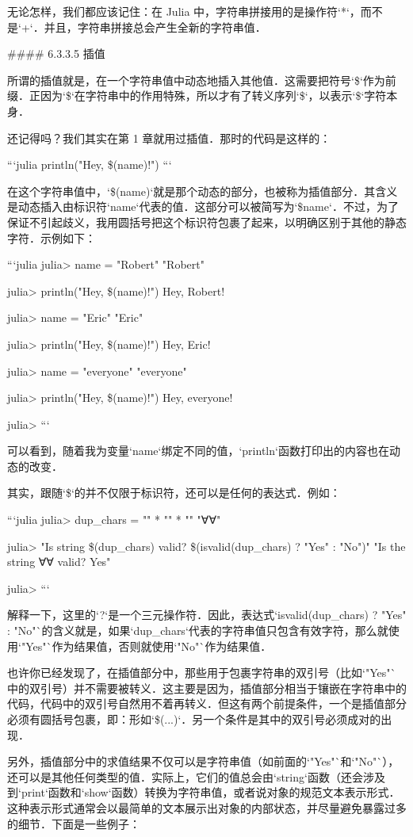 无论怎样，我们都应该记住：在 Julia 中，字符串拼接用的是操作符`*`，而不是`+`．并且，字符串拼接总会产生全新的字符串值．

#### 6.3.3.5 插值

所谓的插值就是，在一个字符串值中动态地插入其他值．这需要把符号`\$`作为前缀．正因为`\$`在字符串中的作用特殊，所以才有了转义序列`\$`，以表示`\$`字符本身．

还记得吗？我们其实在第 1 章就用过插值．那时的代码是这样的：

```julia
println("Hey, \$(name)!")
```

在这个字符串值中，`\$(name)`就是那个动态的部分，也被称为插值部分．其含义是动态插入由标识符`name`代表的值．这部分可以被简写为`\$name`．不过，为了保证不引起歧义，我用圆括号把这个标识符包裹了起来，以明确区别于其他的静态字符．示例如下：

```julia
julia> name = "Robert"
"Robert"

julia> println("Hey, \$(name)!")
Hey, Robert!

julia> name = "Eric"
"Eric"

julia> println("Hey, \$(name)!")
Hey, Eric!

julia> name = "everyone"
"everyone"

julia> println("Hey, \$(name)!")
Hey, everyone!

julia> 
```

可以看到，随着我为变量`name`绑定不同的值，`println`函数打印出的内容也在动态的改变．

其实，跟随`\$`的并不仅限于标识符，还可以是任何的表达式．例如：

```julia
julia> dup_chars = "" * "" * ""
"∀∀"

julia> "Is string \$(dup_chars) valid? \$(isvalid(dup_chars) ? "Yes" : "No")"
"Is the string ∀∀ valid? Yes"

julia> 
```

解释一下，这里的`?`是一个三元操作符．因此，表达式`isvalid(dup_chars) ? "Yes" : "No"`的含义就是，如果`dup_chars`代表的字符串值只包含有效字符，那么就使用`"Yes"`作为结果值，否则就使用`"No"`作为结果值．

也许你已经发现了，在插值部分中，那些用于包裹字符串的双引号（比如`"Yes"`中的双引号）并不需要被转义．这主要是因为，插值部分相当于镶嵌在字符串中的代码，代码中的双引号自然用不着再转义．但这有两个前提条件，一个是插值部分必须有圆括号包裹，即：形如`\$(...)`．另一个条件是其中的双引号必须成对的出现．

另外，插值部分中的求值结果不仅可以是字符串值（如前面的`"Yes"`和`"No"`），还可以是其他任何类型的值．实际上，它们的值总会由`string`函数（还会涉及到`print`函数和`show`函数）转换为字符串值，或者说对象的规范文本表示形式．这种表示形式通常会以最简单的文本展示出对象的内部状态，并尽量避免暴露过多的细节．下面是一些例子：

